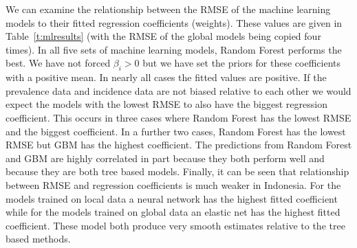 \documentclass[review]{elsarticle}
\begin{document}
We can examine the relationship between the RMSE of the machine learning models to their fitted regression coefficients (weights).
These values are given in Table~\ref{t:mlresults} (with the RMSE of the global models being copied four times).
In all five sets of machine learning models, Random Forest performs the best.
We have not forced $\beta_i > 0$ but we have set the priors for these coefficients with a positive mean.
In nearly all cases the fitted values are positive.
If the prevalence data and incidence data are not biased relative to each other we would expect the models with the lowest RMSE to also have the biggest regression coefficient.
This occurs in three cases where Random Forest has the lowest RMSE and the biggest coefficient.
In a further two cases, Random Forest has the lowest RMSE but GBM has the highest coefficient.
The predictions from Random Forest and GBM are highly correlated in part because they both perform well and because they are both tree based models.
Finally, it can be seen that relationship between RMSE and regression coefficients is much weaker in Indonesia.
For the models trained on local data a neural network has the highest fitted coefficient while for the models trained on global data an elastic net has the highest fitted coefficient.
These model both produce very smooth estimates relative to the tree based methods.




\end{document}
